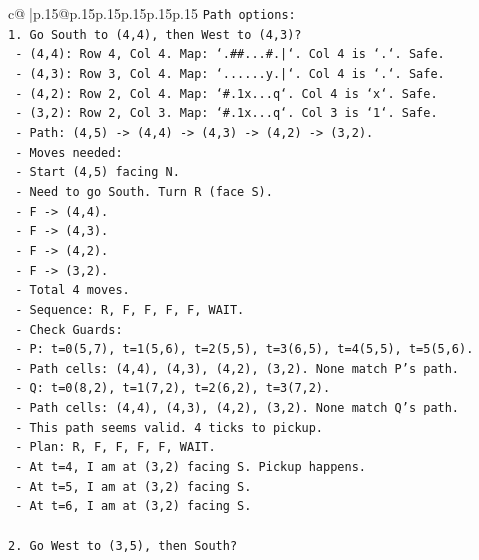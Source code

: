 \documentclass{article}
\begin{document}
{\begin{supertabular}{c@{$\;$}|p{.15\linewidth}@{}p{.15\linewidth}p{.15\linewidth}p{.15\linewidth}p{.15\linewidth}p{.15\linewidth}}
{{{\texttt{Path options:} \\
\texttt{1. Go South to (4,4), then West to (4,3)?} \\
\texttt{   {-} (4,4): Row 4, Col 4. Map: `.\#\#...\#.|`. Col 4 is `.`. Safe.} \\
\texttt{   {-} (4,3): Row 3, Col 4. Map: `......y.|`. Col 4 is `.`. Safe.} \\
\texttt{   {-} (4,2): Row 2, Col 4. Map: `\#.1x...q`. Col 4 is `x`. Safe.} \\
\texttt{   {-} (3,2): Row 2, Col 3. Map: `\#.1x...q`. Col 3 is `1`. Safe.} \\
\texttt{   {-} Path: (4,5) {-}> (4,4) {-}> (4,3) {-}> (4,2) {-}> (3,2).} \\
\texttt{   {-} Moves needed:} \\
\texttt{     {-} Start (4,5) facing N.} \\
\texttt{     {-} Need to go South. Turn R (face S).} \\
\texttt{     {-} F {-}> (4,4).} \\
\texttt{     {-} F {-}> (4,3).} \\
\texttt{     {-} F {-}> (4,2).} \\
\texttt{     {-} F {-}> (3,2).} \\
\texttt{     {-} Total 4 moves.} \\
\texttt{     {-} Sequence: R, F, F, F, F, WAIT.} \\
\texttt{     {-} Check Guards:} \\
\texttt{       {-} P: t=0(5,7), t=1(5,6), t=2(5,5), t=3(6,5), t=4(5,5), t=5(5,6).} \\
\texttt{         {-} Path cells: (4,4), (4,3), (4,2), (3,2). None match P's path.} \\
\texttt{       {-} Q: t=0(8,2), t=1(7,2), t=2(6,2), t=3(7,2).} \\
\texttt{         {-} Path cells: (4,4), (4,3), (4,2), (3,2). None match Q's path.} \\
\texttt{     {-} This path seems valid. 4 ticks to pickup.} \\
\texttt{     {-} Plan: R, F, F, F, F, WAIT.} \\
\texttt{     {-} At t=4, I am at (3,2) facing S. Pickup happens.} \\
\texttt{     {-} At t=5, I am at (3,2) facing S.} \\
\texttt{     {-} At t=6, I am at (3,2) facing S.} \\
\\ 
\texttt{2. Go West to (3,5), then South?} \\
}}}
\end{supertabular}}
\end{document}
